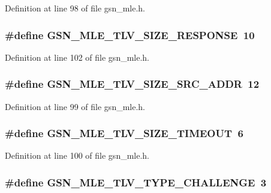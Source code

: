 Definition at line 98 of file gsn\_\-mle.h.

\hypertarget{a00527_a5aaa62eed46095f65360512e198ce6b6}{
\subsubsection[{GSN\_\-MLE\_\-TLV\_\-SIZE\_\-RESPONSE}]{\setlength{\rightskip}{0pt plus 5cm}\#define GSN\_\-MLE\_\-TLV\_\-SIZE\_\-RESPONSE~10}}
\label{a00527_a5aaa62eed46095f65360512e198ce6b6}


Definition at line 102 of file gsn\_\-mle.h.

\hypertarget{a00527_ab8e74552a1d4b8387b4b4e0d3e50cb72}{
\subsubsection[{GSN\_\-MLE\_\-TLV\_\-SIZE\_\-SRC\_\-ADDR}]{\setlength{\rightskip}{0pt plus 5cm}\#define GSN\_\-MLE\_\-TLV\_\-SIZE\_\-SRC\_\-ADDR~12}}
\label{a00527_ab8e74552a1d4b8387b4b4e0d3e50cb72}


Definition at line 99 of file gsn\_\-mle.h.

\hypertarget{a00527_a68a7e6a566d31e3dcb23ad77aded3426}{
\subsubsection[{GSN\_\-MLE\_\-TLV\_\-SIZE\_\-TIMEOUT}]{\setlength{\rightskip}{0pt plus 5cm}\#define GSN\_\-MLE\_\-TLV\_\-SIZE\_\-TIMEOUT~6}}
\label{a00527_a68a7e6a566d31e3dcb23ad77aded3426}


Definition at line 100 of file gsn\_\-mle.h.

\hypertarget{a00527_a533303f595f2cb62527b50ce8f970094}{
\subsubsection[{GSN\_\-MLE\_\-TLV\_\-TYPE\_\-CHALLENGE}]{\setlength{\rightskip}{0pt plus 5cm}\#define GSN\_\-MLE\_\-TLV\_\-TYPE\_\-CHALLENGE~3}}
\label{a00527_a533303f595f2cb62527b50ce8f970094}


